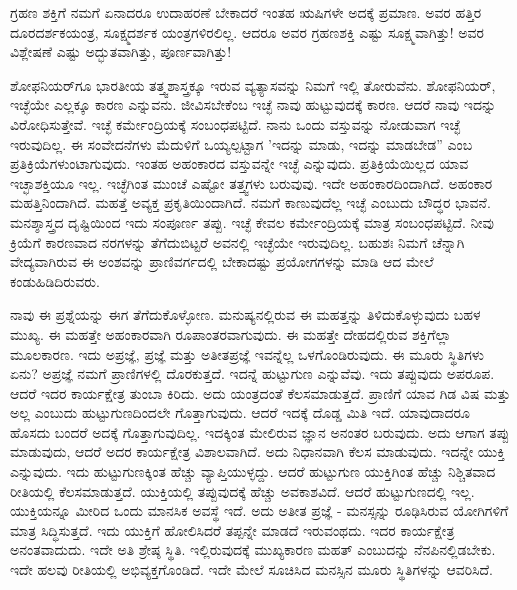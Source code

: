 ಗ್ರಹಣ ಶಕ್ತಿಗೆ ನಮಗೆ ಏನಾದರೂ ಉದಾಹರಣೆ ಬೇಕಾದರೆ ಇಂತಹ ಋಷಿಗಳೇ ಅದಕ್ಕೆ ಪ್ರಮಾಣ. ಅವರ ಹತ್ತಿರ ದೂರದರ್ಶಕಯಂತ್ರ, ಸೂಕ್ಷ್ಮದರ್ಶಕ ಯಂತ್ರಗಳಿರಲಿಲ್ಲ. ಆದರೂ ಅವರ ಗ್ರಹಣಶಕ್ತಿ ಎಷ್ಟು ಸೂಕ್ಷ್ಮವಾಗಿತ್ತು! ಅವರ ವಿಶ್ಲೇಷಣೆ ಎಷ್ಟು ಅದ್ಭುತವಾಗಿತ್ತು, ಪೂರ್ಣವಾಗಿತ್ತು!

ಶೋಫನಿಯರ್‌ಗೂ ಭಾರತೀಯ ತತ್ತ್ವಶಾಸ್ತ್ರಕ್ಕೂ ಇರುವ ವ್ಯತ್ಯಾಸವನ್ನು ನಿಮಗೆ ಇಲ್ಲಿ ತೋರುವೆನು. ಶೋಫನಿಯರ್, ಇಚ್ಛೆಯೇ ಎಲ್ಲಕ್ಕೂ ಕಾರಣ ಎನ್ನುವನು. ಜೀವಿಸಬೇಕೆಂಬ ಇಚ್ಛೆ ನಾವು ಹುಟ್ಟುವುದಕ್ಕೆ ಕಾರಣ. ಆದರೆ ನಾವು ಇದನ್ನು ವಿರೋಧಿಸುತ್ತೇವೆ. ಇಚ್ಛೆ ಕರ್ಮೇಂದ್ರಿಯಕ್ಕೆ ಸಂಬಂಧಪಟ್ಟಿದೆ. ನಾನು ಒಂದು ವಸ್ತುವನ್ನು ನೋಡುವಾಗ ಇಚ್ಛೆ ಇರುವುದಿಲ್ಲ. ಈ ಸಂವೇದನೆಗಳು ಮೆದುಳಿಗೆ ಒಯ್ಯಲ್ಪಟ್ಟಾಗ 'ಇದನ್ನು ಮಾಡು, ಇದನ್ನು ಮಾಡಬೇಡ” ಎಂಬ ಪ್ರತಿಕ್ರಿಯೆಗಳುಂಟಾಗುವುದು. ಇಂತಹ ಅಹಂಕಾರದ ವಸ್ತುವನ್ನೇ ಇಚ್ಛೆ ಎನ್ನುವುದು. ಪ್ರತಿಕ್ರಿಯೆಯಿಲ್ಲದ ಯಾವ ಇಚ್ಛಾಶಕ್ತಿಯೂ ಇಲ್ಲ. ಇಚ್ಛೆಗಿಂತ ಮುಂಚೆ ಎಷ್ಟೋ ತತ್ತ್ವಗಳು ಬರುವುವು. ಇದೇ ಅಹಂಕಾರದಿಂದಾಗಿದೆ. ಅಹಂಕಾರ ಮಹತ್ತಿನಿಂದಾಗಿದೆ. ಮಹತ್ತೆ ಅವ್ಯಕ್ತ ಪ್ರಕೃತಿಯಿಂದಾಗಿದೆ. ನಮಗೆ ಕಾಣುವುದೆಲ್ಲ ಇಚ್ಛೆ ಎಂಬುದು ಬೌದ್ಧರ ಭಾವನೆ. ಮನಶ್ಶಾಸ್ತ್ರದ ದೃಷ್ಟಿಯಿಂದ ಇದು ಸಂಪೂರ್ಣ ತಪ್ಪು. ಇಚ್ಛೆ ಕೇವಲ ಕರ್ಮೇಂದ್ರಿಯಕ್ಕೆ ಮಾತ್ರ ಸಂಬಂಧಪಟ್ಟಿದೆ. ನೀವು ಕ್ರಿಯೆಗೆ ಕಾರಣವಾದ ನರಗಳನ್ನು ತೆಗೆದುಬಿಟ್ಟರೆ ಅವನಲ್ಲಿ ಇಚ್ಛೆಯೇ ಇರುವುದಿಲ್ಲ. ಬಹುಶಃ ನಿಮಗೆ ಚೆನ್ನಾಗಿ ವೇದ್ಯವಾಗಿರುವ ಈ ಅಂಶವನ್ನು ಪ್ರಾಣಿವರ್ಗದಲ್ಲಿ ಬೇಕಾದಷ್ಟು ಪ್ರಯೋಗಗಳನ್ನು ಮಾಡಿ ಆದ ಮೇಲೆ ಕಂಡುಹಿಡಿದಿರುವರು.

ನಾವು ಈ ಪ್ರಶ್ನೆಯನ್ನು ಈಗ ತೆಗೆದುಕೊಳ್ಳೋಣ. ಮನುಷ್ಯನಲ್ಲಿರುವ ಈ ಮಹತ್ತನ್ನು ತಿಳಿದುಕೊಳ್ಳುವುದು ಬಹಳ ಮುಖ್ಯ. ಈ ಮಹತ್ತೇ ಅಹಂಕಾರವಾಗಿ ರೂಪಾಂತರವಾಗುವುದು. ಈ ಮಹತ್ತೇ ದೇಹದಲ್ಲಿರುವ ಶಕ್ತಿಗೆಲ್ಲಾ ಮೂಲಕಾರಣ. ಇದು ಅಪ್ರಜ್ಞೆ, ಪ್ರಜ್ಞೆ ಮತ್ತು ಅತೀತಪ್ರಜ್ಞೆ ಇವನ್ನೆಲ್ಲ ಒಳಗೊಂಡಿರುವುದು. ಈ ಮೂರು ಸ್ಥಿತಿಗಳು ಏನು? ಅಪ್ರಜ್ಞೆ ನಮಗೆ ಪ್ರಾಣಿಗಳಲ್ಲಿ ದೊರಕುತ್ತದೆ. ಇದನ್ನೆ ಹುಟ್ಟುಗುಣ ಎನ್ನುವೆವು. ಇದು ತಪ್ಪುವುದು ಅಪರೂಪ. ಆದರೆ ಇದರ ಕಾರ್ಯಕ್ಷೇತ್ರ ತುಂಬಾ ಕಿರಿದು. ಅದು ಯಂತ್ರದಂತೆ ಕೆಲಸಮಾಡುತ್ತದೆ. ಪ್ರಾಣಿಗೆ ಯಾವ ಗಿಡ ವಿಷ ಮತ್ತು ಅಲ್ಲ ಎಂಬುದು ಹುಟ್ಟುಗುಣದಿಂದಲೇ ಗೊತ್ತಾಗುವುದು. ಆದರೆ ಇದಕ್ಕೆ ದೊಡ್ಡ ಮಿತಿ ಇದೆ. ಯಾವುದಾದರೂ ಹೊಸದು ಬಂದರೆ ಅದಕ್ಕೆ ಗೊತ್ತಾಗುವುದಿಲ್ಲ. ಇದಕ್ಕಿಂತ ಮೇಲಿರುವ ಜ್ಞಾನ ಅನಂತರ ಬರುವುದು. ಅದು ಆಗಾಗ ತಪ್ಪು ಮಾಡುವುದು, ಆದರೆ ಅದರ ಕಾರ್ಯಕ್ಷೇತ್ರ ವಿಶಾಲವಾಗಿದೆ. ಅದು ನಿಧಾನವಾಗಿ ಕೆಲಸ ಮಾಡುವುದು. ಇದನ್ನೇ ಯುಕ್ತಿ ಎನ್ನುವುದು. ಇದು ಹುಟ್ಟುಗುಣಕ್ಕಿಂತ ಹೆಚ್ಚು ವ್ಯಾಪ್ತಿಯುಳ್ಳದ್ದು. ಆದರೆ ಹುಟ್ಟುಗುಣ ಯುಕ್ತಿಗಿಂತ ಹೆಚ್ಚು ನಿಶ್ಚಿತವಾದ ರೀತಿಯಲ್ಲಿ ಕೆಲಸಮಾಡುತ್ತದೆ. ಯುಕ್ತಿಯಲ್ಲಿ ತಪ್ಪುವುದಕ್ಕೆ ಹೆಚ್ಚು ಅವಕಾಶವಿದೆ. ಆದರೆ ಹುಟ್ಟುಗುಣದಲ್ಲಿ ಇಲ್ಲ. ಯುಕ್ತಿಯನ್ನೂ ಮೀರಿದ ಒಂದು ಮಾನಸಿಕ ಅವಸ್ಥೆ ಇದೆ. ಅದು ಅತೀತ ಪ್ರಜ್ಞೆ - ಮನಸ್ಸನ್ನು ರೂಢಿಸಿರುವ ಯೋಗಿಗಳಿಗೆ ಮಾತ್ರ ಸಿದ್ಧಿಸುತ್ತದೆ. ಇದು ಯುಕ್ತಿಗೆ ಹೋಲಿಸಿದರೆ ತಪ್ಪನ್ನೇ ಮಾಡದೆ ಇರುವಂಥದು. ಇದರ ಕಾರ್ಯಕ್ಷೇತ್ರ ಅನಂತವಾದುದು. ಇದೇ ಅತಿ ಶ್ರೇಷ್ಠ ಸ್ಥಿತಿ. ಇಲ್ಲಿರುವುದಕ್ಕೆ ಮುಖ್ಯಕಾರಣ ಮಹತ್ ಎಂಬುದನ್ನು ನೆನಪಿನಲ್ಲಿಡಬೇಕು. ಇದೇ ಹಲವು ರೀತಿಯಲ್ಲಿ ಅಭಿವ್ಯಕ್ತಗೊಂಡಿದೆ. ಇದೇ ಮೇಲೆ ಸೂಚಿಸಿದ ಮನಸ್ಸಿನ ಮೂರು ಸ್ಥಿತಿಗಳನ್ನು ಆವರಿಸಿದೆ.

